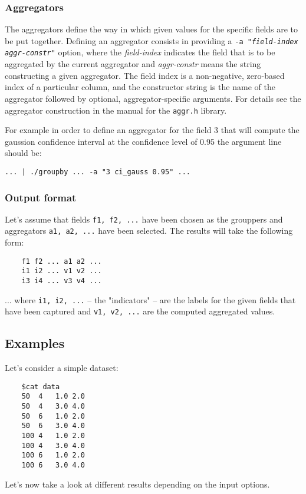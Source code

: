 	\subsubsection{Aggregators}
	The aggregators define the way in which given values for the specific fields
	are to be put together. Defining an aggregator consists in providing a
	\texttt{-a "\textit{field-index} \textit{aggr-constr}"} option, where the
	\textit{field-index} indicates the field that is to be aggregated by the
	current aggregator and \textit{aggr-constr} means the string constructing
	a given aggregator. The field index is a non-negative, zero-based index
	of a particular column, and the constructor string is the name of the
	aggregator followed by optional, aggregator-specific arguments. For details see
	the aggregator construction in the manual for the \texttt{aggr.h} library.

	For example in order to define an aggregator for the field 3 that will compute
	the gaussion confidence interval at the confidence level of 0.95 the argument
	line should be:

	\texttt{... | ./groupby ... -a "3 ci\_gauss 0.95" ...}

	\subsubsection{Output format}
	Let's assume that fields \texttt{f1, f2, ...} have been chosen as the
	grouppers and aggregators \texttt{a1, a2, ...} have been selected.
	The results will take the following form:
	\begin{verbatim}
	f1 f2 ... a1 a2 ...
	i1 i2 ... v1 v2 ...
	i3 i4 ... v3 v4 ...
	\end{verbatim}

	... where \texttt{i1, i2, ...} -- the "indicators" -- are the labels for
	the given fields that have been captured and \texttt{v1, v2, ...} are
	the computed aggregated values.

	\subsection{Examples}
	Let's consider a simple dataset:
	\begin{verbatim}
	$cat data
	50	4	1.0	2.0
	50	4	3.0	4.0
	50	6	1.0	2.0
	50	6	3.0	4.0
	100	4	1.0	2.0
	100	4	3.0	4.0
	100	6	1.0	2.0
	100	6	3.0	4.0
	\end{verbatim}

	Let's now take a look at different results depending on the input options.

